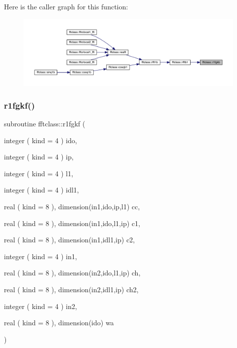Here is the caller graph for this function\+:\nopagebreak
\begin{figure}[H]
\begin{center}
\leavevmode
\includegraphics[width=350pt]{namespacefftclass_aa5cb9e2d3b6aa9d5adcb4144cd17f10e_icgraph}
\end{center}
\end{figure}
\mbox{\label{namespacefftclass_adb327056327448d0a605271d57091578}} 
\subsubsection{\texorpdfstring{r1fgkf()}{r1fgkf()}}
{\footnotesize\ttfamily subroutine fftclass\+::r1fgkf (\begin{DoxyParamCaption}\item[{integer ( kind = 4 )}]{ido,  }\item[{integer ( kind = 4 )}]{ip,  }\item[{integer ( kind = 4 )}]{l1,  }\item[{integer ( kind = 4 )}]{idl1,  }\item[{real ( kind = 8 ), dimension(in1,ido,ip,l1)}]{cc,  }\item[{real ( kind = 8 ), dimension(in1,ido,l1,ip)}]{c1,  }\item[{real ( kind = 8 ), dimension(in1,idl1,ip)}]{c2,  }\item[{integer ( kind = 4 )}]{in1,  }\item[{real ( kind = 8 ), dimension(in2,ido,l1,ip)}]{ch,  }\item[{real ( kind = 8 ), dimension(in2,idl1,ip)}]{ch2,  }\item[{integer ( kind = 4 )}]{in2,  }\item[{real ( kind = 8 ), dimension(ido)}]{wa }\end{DoxyParamCaption})}

